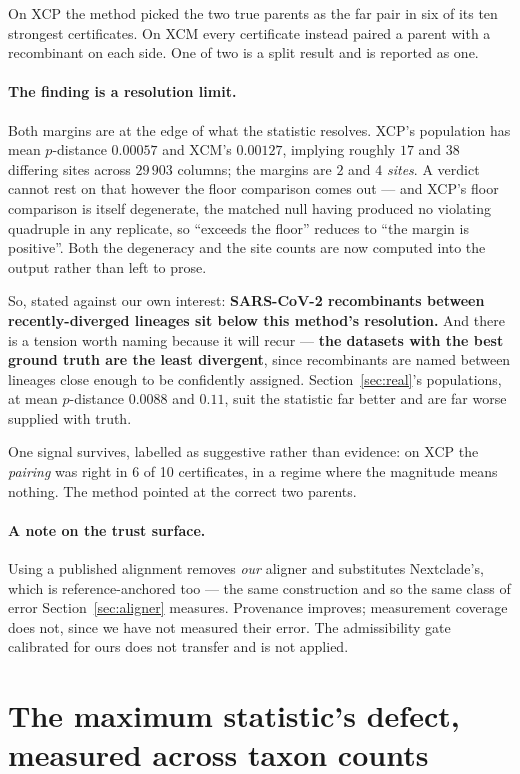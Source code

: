 \documentclass[11pt,a4paper]{article}
\theoremstyle{definition}
\theoremstyle{remark}
\begin{document}
On XCP the method picked the two true parents as the far pair in six of its ten
strongest certificates. On XCM every certificate instead paired a parent with a
recombinant on each side. One of two is a split result and is reported as one.

\paragraph{The finding is a resolution limit.} Both margins are at the edge of
what the statistic resolves. XCP's population has mean $p$-distance $0.00057$ and
XCM's $0.00127$, implying roughly $17$ and $38$ differing sites across $29\,903$
columns; the margins are $2$ and $4$ \emph{sites}. A verdict cannot rest on that
however the floor comparison comes out --- and XCP's floor comparison is itself
degenerate, the matched null having produced no violating quadruple in any
replicate, so ``exceeds the floor'' reduces to ``the margin is positive''. Both
the degeneracy and the site counts are now computed into the output rather than
left to prose.

So, stated against our own interest: \textbf{SARS-CoV-2 recombinants between
recently-diverged lineages sit below this method's resolution.} And there is a
tension worth naming because it will recur --- \textbf{the datasets with the best
ground truth are the least divergent}, since recombinants are named between
lineages close enough to be confidently assigned. Section~\ref{sec:real}'s
populations, at mean $p$-distance $0.0088$ and $0.11$, suit the statistic far
better and are far worse supplied with truth.

One signal survives, labelled as suggestive rather than evidence: on XCP the
\emph{pairing} was right in 6 of 10 certificates, in a regime where the magnitude
means nothing. The method pointed at the correct two parents.

\paragraph{A note on the trust surface.} Using a published alignment removes
\emph{our} aligner and substitutes Nextclade's, which is reference-anchored too
--- the same construction and so the same class of error Section~\ref{sec:aligner}
measures. Provenance improves; measurement coverage does not, since we have not
measured their error. The admissibility gate calibrated for ours does not
transfer and is not applied.

\section{The maximum statistic's defect, measured across taxon counts}
\label{sec:scale}
\end{document}
